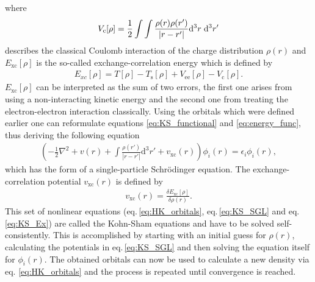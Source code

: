 where 
\begin{align}
    V_{\mathrm{c}}[\rho] = \frac{1}{2}\int\int\frac{\rho(r) \rho(r')}{|r-r'|} \mathrm{d}^{3}r \hspace{0.1 cm} \mathrm{d}^{3}r'
\end{align}
describes the classical Coulomb interaction of the charge distribution $\rho(r)$ and $E_{\mathrm{xc}}[\rho]$ is the so-called exchange-correlation energy which is defined by 
\begin{align}
    E_{xc}[\rho] = T[\rho] - T_{\mathrm{s}}[\rho] + V_{\mathrm{ee}}[\rho] - V_{\mathrm{c}}[\rho].
\end{align}
$E_{\mathrm{xc}}[\rho]$ can be interpreted as the sum of two errors, the first one arises from using a non-interacting kinetic energy and the second one from treating the electron-electron interaction classically. Using the orbitals which were defined earlier one can reformulate equations \ref{eq:KS_functional} and \ref{eq:energy_func}, thus deriving the following equation
\begin{align} \label{eq:KS_SGL}
    \left(-\frac{1}{2}\nabla^{2} + v(r) + \int\frac{\rho(r')}{|r-r'|} \mathrm{d}^{3}r' + v_{\mathrm{xc}}(r)\right)\phi_i(r) = \epsilon_i \phi_i(r),
\end{align}
which has the form of a single-particle Schrödinger equation. The exchange-correlation potential $v_{\mathrm{xc}}(r)$ is defined by 
\begin{align} \label{eq:KS_Ex}
    v_{\mathrm{xc}}(r) = \frac{\delta E_{\mathrm{xc}}[\rho]}{\delta \rho(r)}.
\end{align}
This set of nonlinear equations (eq.\,\ref{eq:HK_orbitals}, eq.\,\ref{eq:KS_SGL} and eq.\,\ref{eq:KS_Ex}) are called the Kohn-Sham equations and have to be solved self-consistently. This is accomplished by starting with an initial guess for $\rho(r)$, calculating the potentials in eq.\,\ref{eq:KS_SGL} and then solving the equation itself for $\phi_i(r)$. The obtained orbitals can now be used to calculate a new density via eq. \ref{eq:HK_orbitals} and the process is repeated until convergence is reached.




